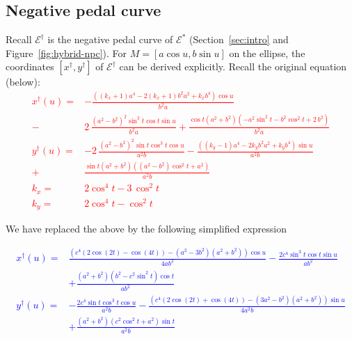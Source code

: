  

 \subsection{ Negative pedal curve}
 
 
Recall $\mathcal{E}^\dagger$ is the negative pedal curve of $\mathcal{E}^*$ (Section~\ref{sec:intro} and Figure~\ref{fig:hybrid-npc}). For $M=[a\cos u,b\sin u]$ on the ellipse, the coordinates $[x^\dagger,y^\dagger]$ of $\mathcal{E}^\dagger$ can be derived explicitly. Recall the original equation (below):
\textcolor{red}{{\small
\begin{align*}
x^{\dagger}(u)=&-{\frac { \left( \left(  k_x+1 \right) {a}^{4}-2
 \left(k_x+1\right) {b}^{2}{a}^{2}+ k_x b^4  \right)\cos u
}{{b}^{2}a}}\\
-&2\,{\frac { \left( {a}^{2}-{b}^{2} \right) ^{2}   
\sin^{3}t \cos{t}\sin{u}}{{b}^{2}a}} 
 + \frac {\cos t \left( {a}^{2}+{b
}^{2} \right)  \left( -{a}^{2} \sin^2t-{b}^{2} \cos^2t+2\,{b}^{2}
 \right) }{{b}^{2}a}\\
 y^{\dagger}(u)=&-2\,{\frac { \left( {a}^{2}-{b}^{2} \right) ^{2}\sin t
 \cos^3{t}  \cos u}{{a}
^{2}b}}-{\frac { \left(  \left(k_y-1 \right) {a
}^{4}-2 k_y {b}^{2}{a}^{2}+
 k_y {b}^{4} \right) \sin u}{{a}^{2}b}}\\
 +&{\frac {\sin t \left( {a}^{2}+{b
}^{2} \right)  \left( ({a}^{2}-b^2) \cos^2t+{a}^{2} \right) 
}{{a}^{2}b}}\\
k_x=&2\cos^4t-3\, \cos^2t\\
k_y=&2\cos^{4}t- \cos^2t
\end{align*}
}
}

We have replaced the above by the following simplified expression

\textcolor{blue}
{\small  
\begin{align*}
x^{\dagger}(u)=&\frac{\left(c^4(2\cos(2t) - \cos(4t)) - (a^2 - 3b^2)(a^2 + b^2)\right)\cos{u} }{4 a b^2} - \frac{2c^4 \sin^3t \cos{t} \sin{u}}{a b^2}\\
&+ \frac{(a^2 + b^2)(b^2-c^2\sin^2{t}  )\cos{t}}{a b^2}\\
y^{\dagger}(u)=&-\frac{2c^4 \sin{t} \cos^3{t}\cos{u}}{a^2b} - \frac{(c^4(2\cos(2t) + \cos(4t)) - (3a^2 - b^2)(a^2 + b^2))\sin{u}}{ 4a^2b}\\
&+\frac{  (a^2 + b^2)(c^2 \cos^2{t}    + a^2)\sin{t}}{a^2 b}
\end{align*}
}
